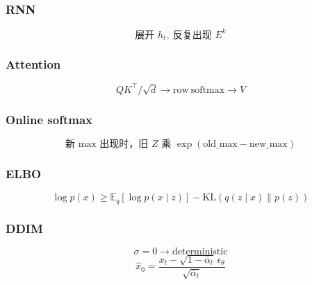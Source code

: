 \subsubsection{RNN}
\[
\text{展开 }h_t,\ \text{反复出现 }E^k
\]

\subsubsection{Attention}
\[
QK^\top/\sqrt d \rightarrow \mathrm{row\ softmax} \rightarrow V
\]

\subsubsection{Online softmax}
\[
\text{新 max 出现时，旧 }Z\text{ 乘 }\exp(\mathrm{old\_max}-\mathrm{new\_max})
\]

\subsubsection{ELBO}
\[
\log p(x)\ge \mathbb E_q[\log p(x\mid z)]-\mathrm{KL}(q(z\mid x)\|p(z))
\]

\subsubsection{DDIM}
\[
\sigma=0 \rightarrow \text{deterministic}
\]
\[
\hat x_0=
\frac{x_t-\sqrt{1-\bar\alpha_t}\,\epsilon_\theta}{\sqrt{\bar\alpha_t}}
\]
